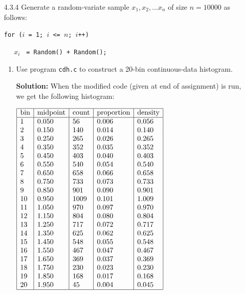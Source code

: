\documentclass[11pt]{article} %
\newcommand{\tab}{\;\;\;\;\;}
\begin{document}
\begin{enumerate}
\newpage

\item[4.3.4] Generate a random-variate sample $x_1, x_2, \ldots x_n$ of size $n = 10000$ as follows:

\texttt{for (}$i$\texttt{ = 1; }$i$\texttt{ <= }$n$\texttt{; }$i$\texttt{++)}

$\tab x_i$ \texttt{ = Random() + Random();}

\begin{enumerate}

\item Use program \texttt{cdh.c} to construct a 20-bin continuous-data histogram.

{\bf Solution:} When the modified code (given at end of assignment) is run, we get the following histogram:

$\begin{array}{|l|l|l|l|l|}\hline
\textrm{bin} & \textrm{midpoint} & \textrm{count} & \textrm{proportion} & \textrm{density} \\\hline
    1 &       0.050 &        56 &       0.006 &       0.056\\
    2 &       0.150 &       140 &       0.014 &       0.140\\
    3 &       0.250 &       265 &       0.026 &       0.265\\
    4 &       0.350 &       352 &       0.035 &       0.352\\
    5 &       0.450 &       403 &       0.040 &       0.403\\
    6 &       0.550 &       540 &       0.054 &       0.540\\
    7 &       0.650 &       658 &       0.066 &       0.658\\
    8 &       0.750 &       733 &       0.073 &       0.733\\
    9 &       0.850 &       901 &       0.090 &       0.901\\
   10 &       0.950 &      1009 &       0.101 &       1.009\\
   11 &       1.050 &       970 &       0.097 &       0.970\\
   12 &       1.150 &       804 &       0.080 &       0.804\\
   13 &       1.250 &       717 &       0.072 &       0.717\\
   14 &       1.350 &       625 &       0.062 &       0.625\\
   15 &       1.450 &       548 &       0.055 &       0.548\\
   16 &       1.550 &       467 &       0.047 &       0.467\\
   17 &       1.650 &       369 &       0.037 &       0.369\\
   18 &       1.750 &       230 &       0.023 &       0.230\\
   19 &       1.850 &       168 &       0.017 &       0.168\\
   20 &       1.950 &        45 &       0.004 &       0.045\\\hline
   \end{array}$


\end{enumerate}
\end{enumerate}
\end{document}
